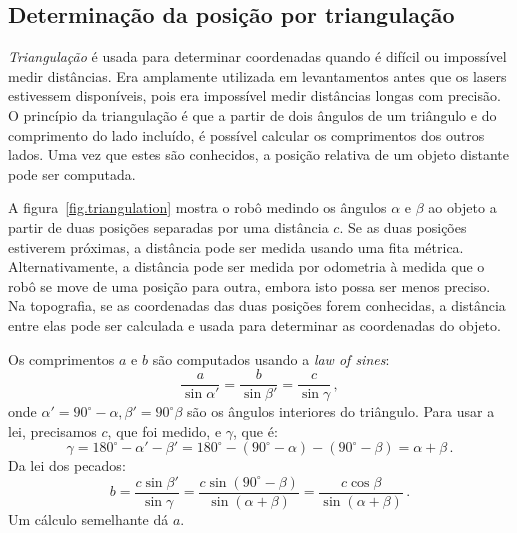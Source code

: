\subsection{Determinação da posição por triangulação}

\emph{Triangulação} é usada para determinar coordenadas quando é difícil ou impossível medir distâncias. Era amplamente utilizada em levantamentos antes que os lasers estivessem disponíveis, pois era impossível medir distâncias longas com precisão. O princípio da triangulação é que a partir de dois ângulos de um triângulo e do comprimento do lado incluído, é possível calcular os comprimentos dos outros lados. Uma vez que estes são conhecidos, a posição relativa de um objeto distante pode ser computada.

A figura~\ref{fig.triangulation} mostra o robô medindo os ângulos $\alpha$ e $\beta$ ao objeto a partir de duas posições separadas por uma distância $c$. Se as duas posições estiverem próximas, a distância pode ser medida usando uma fita métrica. Alternativamente, a distância pode ser medida por odometria à medida que o robô se move de uma posição para outra, embora isto possa ser menos preciso. Na topografia, se as coordenadas das duas posições forem conhecidas, a distância entre elas pode ser calculada e usada para determinar as coordenadas do objeto.

Os comprimentos $a$ e $b$ são computados usando a \emph{law of sines}:
\begin{displaymath}
\frac{a}{\sin\alpha'} = \frac{b}{\sin\beta'} = \frac{c}{\sin\gamma}\,,
\end{displaymath}
onde $\alpha' = 90^\circ{} - \alpha, \beta' = 90^\circ{} \beta$ são os ângulos interiores do triângulo. Para usar a lei, precisamos $c$, que foi medido, e $\gamma$, que é:
\begin{displaymath}
\gamma = 180^{\circ}-\alpha'-\beta' = 180^{\circ} - (90^{\circ} -
\alpha) - (90^{\circ} - \beta) = \alpha + \beta\,.
\end{displaymath}
Da lei dos pecados:
\begin{displaymath}
b = \frac{c\sin\beta'}{\sin\gamma} =
\frac{c\sin (90^{\circ} - \beta)}{\sin (\alpha + \beta)} =
\frac{c\cos\beta}{\sin (\alpha + \beta)}\,.
\end{displaymath}
Um cálculo semelhante dá $a$.

